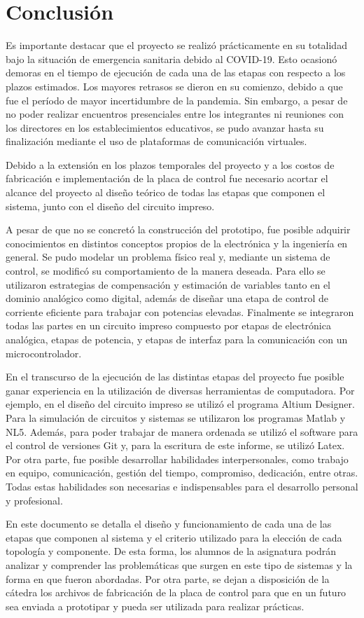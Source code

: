 \chapter{Conclusión}  \label{cap:Conclusión}
Es importante destacar que el proyecto se realizó prácticamente en su totalidad bajo la situación de emergencia sanitaria debido al COVID-19. Esto ocasionó demoras en el tiempo de ejecución de cada una de las etapas con respecto a los plazos estimados. Los mayores retrasos se dieron en su comienzo, debido a que fue el período de mayor incertidumbre de la pandemia. Sin embargo, a pesar de no poder realizar encuentros presenciales entre los integrantes ni reuniones con los directores en los establecimientos educativos, se pudo avanzar hasta su finalización  mediante el uso de plataformas de comunicación virtuales.

Debido a la extensión en los plazos temporales del proyecto y a los costos de fabricación e implementación de la placa de control fue necesario acortar el alcance del proyecto al diseño teórico de todas las etapas que componen el sistema, junto con el diseño del circuito impreso.

A pesar de que no se concretó la construcción del prototipo, fue posible adquirir conocimientos en distintos conceptos propios de la electrónica y la ingeniería en general. Se pudo modelar un problema físico real y, mediante un sistema de control, se modificó su comportamiento de la manera deseada. Para ello se utilizaron estrategias de compensación y estimación de variables tanto en el dominio analógico como digital, además de diseñar una etapa de control de corriente eficiente para trabajar con potencias elevadas. Finalmente se integraron todas las partes en un circuito impreso compuesto por etapas de electrónica analógica, etapas de potencia, y etapas de interfaz para la comunicación con un microcontrolador.

En el transcurso de la ejecución de las distintas etapas del proyecto fue posible ganar experiencia en la utilización de diversas herramientas de computadora. Por ejemplo, en el diseño del circuito impreso se utilizó el programa Altium Designer. Para la simulación de circuitos y sistemas se utilizaron los programas Matlab y NL5. Además, para poder trabajar de manera ordenada se utilizó el software para el control de versiones Git y, para la escritura de este informe, se utilizó Latex. Por otra parte, fue posible desarrollar habilidades interpersonales, como trabajo en equipo, comunicación, gestión del tiempo, compromiso, dedicación, entre otras. Todas estas habilidades son necesarias e indispensables para el desarrollo personal y profesional.


En este documento se detalla el diseño y funcionamiento de cada una de las etapas que componen al sistema y el criterio utilizado para la elección de cada topología y componente. De esta forma, los alumnos de la asignatura podrán analizar y comprender las problemáticas que surgen en este tipo de sistemas y la forma en que fueron abordadas. Por otra parte, se dejan a disposición de la cátedra  los archivos de fabricación de la placa de control para que en un futuro sea enviada  a prototipar y pueda ser utilizada para realizar prácticas.
